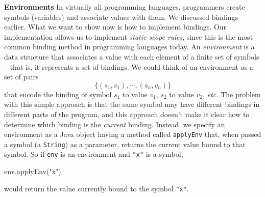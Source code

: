 \begin{minipage}[t]{\sw}
\slidenumber
\LARGE
{\bf Environments}\exx
In virtually all programming languages,
programmers create symbols (variables) and associate values with them.
We discussed bindings earlier.
What we want to show now is how to implement bindings.
Our implementation allows us to implement {\em static scope rules},
since this is the most common binding method in programming languages today.\exx
An {\em environment} is a data structure that associates a value
with each element of a finite set of symbols --
that is, it represents a set of bindings.
We could think of an environment as a set of pairs
\Large
\[\{(s_1,v_1),\cdots,(s_n,v_n)\}\]
\LARGE
that encode the binding of symbol $s_1$ to value $v_1$,
$s_2$ to value $v_2$, {\em etc.}
The problem with this simple approach is that
the same symbol may have different bindings
in different parts of the program,
and this approach doesn't make it clear
how to determine which binding is the {\em current} binding.\exx
Instead, we specify an environment as a Java object
having a method called \verb'applyEnv' that,
when passed a symbol (a \verb'String') as a parameter,
returns the current value bound to that symbol.
So if \verb'env' is an environment and \verb'"x"' is a symbol,
\Large
\begin{qv}
env.applyEnv("x")
\end{qv}
\LARGE
would return the value currently bound to the symbol \verb'"x"'.\exx
\end{minipage}
